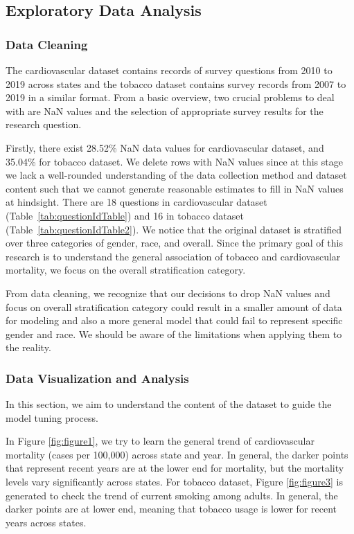 \documentclass{article}
\begin{document}
\subsection{Exploratory Data Analysis}
\subsubsection{Data Cleaning}
The cardiovascular dataset contains records of survey questions from 2010 to 2019 across states and the tobacco dataset contains survey records from 2007 to 2019 in a similar format. From a basic overview, two crucial problems to deal with are NaN values and the selection of appropriate survey results for the research question. 

Firstly, there exist 28.52\% NaN data values for cardiovascular dataset, and 35.04\% for tobacco dataset. We delete rows with NaN values since at this stage we lack a well-rounded understanding of the data collection method and dataset content such that we cannot generate reasonable estimates to fill in NaN values at hindsight. 
There are 18 questions in cardiovascular dataset (Table~\ref{tab:questionIdTable}) and 16 in tobacco dataset (Table~\ref{tab:questionIdTable2}). We notice that the original dataset is stratified over three categories of gender, race, and overall. Since the primary goal of this research is to understand the general association of tobacco and cardiovascular mortality, we focus on the overall stratification category. 

From data cleaning, we recognize that our decisions to drop NaN values and focus on overall stratification category could result in a smaller amount of data for modeling and also a more general model that could fail to represent specific gender and race. We should be aware of the limitations when applying them to the reality.  

\subsubsection{Data Visualization and Analysis}

In this section, we aim to understand the content of the dataset to guide the model tuning process. 

In Figure \ref{fig:figure1}, we try to learn the general trend of cardiovascular mortality (cases per 100,000) across state and year. In general, the darker points that represent recent years are at the lower end for mortality, but the mortality levels vary significantly across states. For tobacco dataset, Figure \ref{fig:figure3} is generated to check the trend of current smoking among adults. In general, the darker points are at lower end, meaning that tobacco usage is lower for recent years across states.
\end{document}
